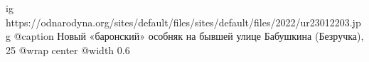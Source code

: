  
 
 
 
 

\ifcmt
  ig https://odnarodyna.org/sites/default/files/sites/default/files/2022/ur23012203.jpg
  @caption Новый «баронский» особняк на бывшей улице Бабушкина (Безручка), 25
	@wrap center
	@width 0.6
\fi
